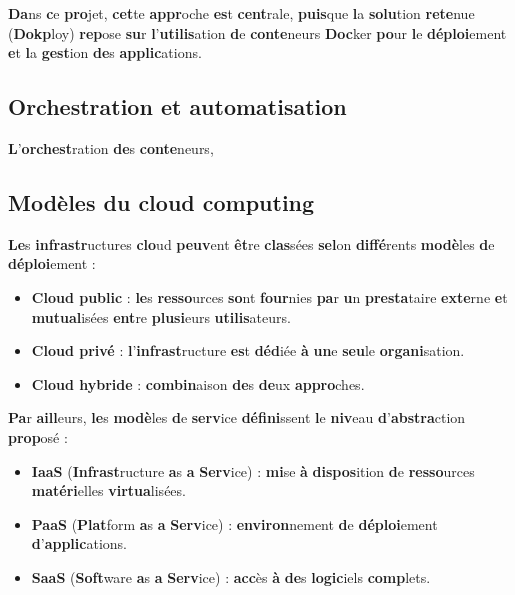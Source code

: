 \documentclass{rapportClass} %
\begin{document}
\textbf{Da}ns \textbf{c}e \textbf{pro}jet, \textbf{cet}te \textbf{appr}oche \textbf{es}t \textbf{cent}rale, \textbf{puis}que \textbf{l}a \textbf{solu}tion
\textbf{rete}nue (\textbf{Dokp}loy) \textbf{rep}ose \textbf{su}r \textbf{l}’\textbf{utilis}ation \textbf{d}e \textbf{conte}neurs \textbf{Doc}ker \textbf{po}ur
\textbf{l}e \textbf{déploi}ement \textbf{e}t \textbf{l}a \textbf{gest}ion \textbf{de}s \textbf{applic}ations.

\subsection{Orchestration et automatisation}
\textbf{L}’\textbf{orchest}ration \textbf{de}s \textbf{conte}neurs, 

\subsection{Modèles du cloud computing}

\textbf{Le}s \textbf{infrastr}uctures \textbf{clo}ud \textbf{peuv}ent \textbf{êt}re \textbf{clas}sées \textbf{sel}on \textbf{diffé}rents
\textbf{modè}les \textbf{d}e \textbf{déploi}ement :

\begin{itemize}
\item \textbf{\textbf{Clo}ud \textbf{pub}lic} : \textbf{le}s \textbf{resso}urces \textbf{so}nt \textbf{four}nies \textbf{pa}r \textbf{u}n
\textbf{presta}taire \textbf{exte}rne \textbf{e}t \textbf{mutual}isées \textbf{ent}re \textbf{plusi}eurs \textbf{utilis}ateurs.
\item \textbf{\textbf{Clo}ud \textbf{pri}vé} : \textbf{l}’\textbf{infrast}ructure \textbf{es}t \textbf{déd}iée \textbf{à} \textbf{un}e \textbf{seu}le
\textbf{organi}sation.
\item \textbf{\textbf{Clo}ud \textbf{hybr}ide} : \textbf{combin}aison \textbf{de}s \textbf{de}ux \textbf{appro}ches.
\end{itemize}

\textbf{Pa}r \textbf{aill}eurs, \textbf{le}s \textbf{modè}les \textbf{d}e \textbf{serv}ice \textbf{défini}ssent \textbf{l}e \textbf{niv}eau
\textbf{d}’\textbf{abstra}ction \textbf{prop}osé \cite{NIST2026, ISO2026} :

\begin{itemize}
\item \textbf{\textbf{Ia}aS} (\textbf{Infrast}ructure \textbf{a}s \textbf{a} \textbf{Serv}ice) : \textbf{mi}se \textbf{à} \textbf{dispos}ition
\textbf{d}e \textbf{resso}urces \textbf{matéri}elles \textbf{virtua}lisées.
\item \textbf{\textbf{Pa}aS} (\textbf{Plat}form \textbf{a}s \textbf{a} \textbf{Serv}ice) : \textbf{environ}nement \textbf{d}e
\textbf{déploi}ement \textbf{d}’\textbf{applic}ations.
\item \textbf{\textbf{Sa}aS} (\textbf{Soft}ware \textbf{a}s \textbf{a} \textbf{Serv}ice) : \textbf{acc}ès \textbf{à} \textbf{de}s \textbf{logic}iels
\textbf{comp}lets.
\end{itemize}
\end{document}
